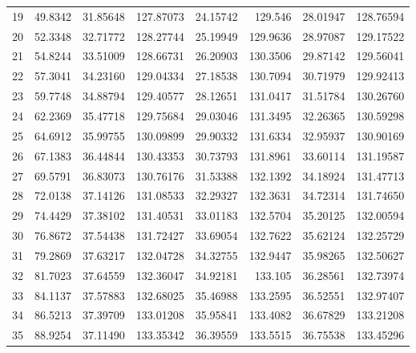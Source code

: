 \begin{table}[ht!]
{\begin{tabular}{@{}rrrrrrrr@{}}
19 & 49.8342 & 31.85648 & 127.87073 & 24.15742 & 129.546  & 28.01947 & 128.76594 \\
20 & 52.3348 & 32.71772 & 128.27744 & 25.19949 & 129.9636 & 28.97087 & 129.17522 \\
21 & 54.8244 & 33.51009 & 128.66731 & 26.20903 & 130.3506 & 29.87142 & 129.56041 \\
22 & 57.3041 & 34.23160 & 129.04334 & 27.18538 & 130.7094 & 30.71979 & 129.92413 \\
23 & 59.7748 & 34.88794 & 129.40577 & 28.12651 & 131.0417 & 31.51784 & 130.26760 \\
24 & 62.2369 & 35.47718 & 129.75684 & 29.03046 & 131.3495 & 32.26365 & 130.59298 \\
25 & 64.6912 & 35.99755 & 130.09899 & 29.90332 & 131.6334 & 32.95937 & 130.90169 \\
26 & 67.1383 & 36.44844 & 130.43353 & 30.73793 & 131.8961 & 33.60114 & 131.19587 \\
27 & 69.5791 & 36.83073 & 130.76176 & 31.53388 & 132.1392 & 34.18924 & 131.47713 \\
28 & 72.0138 & 37.14126 & 131.08533 & 32.29327 & 132.3631 & 34.72314 & 131.74650 \\
29 & 74.4429 & 37.38102 & 131.40531 & 33.01183 & 132.5704 & 35.20125 & 132.00594 \\
30 & 76.8672 & 37.54438 & 131.72427 & 33.69054 & 132.7622 & 35.62124 & 132.25729 \\
31 & 79.2869 & 37.63217 & 132.04728 & 34.32755 & 132.9447 & 35.98265 & 132.50627 \\
32 & 81.7023 & 37.64559 & 132.36047 & 34.92181 & 133.105  & 36.28561 & 132.73974 \\
33 & 84.1137 & 37.57883 & 132.68025 & 35.46988 & 133.2595 & 36.52551 & 132.97407 \\
34 & 86.5213 & 37.39709 & 133.01208 & 35.95841 & 133.4082 & 36.67829 & 133.21208 \\
35 & 88.9254 & 37.11490 & 133.35342 & 36.39559 & 133.5515 & 36.75538 & 133.45296 \\ \bottomrule
\end{tabular}%
}
\end{table}
\vfill
\clearpage


